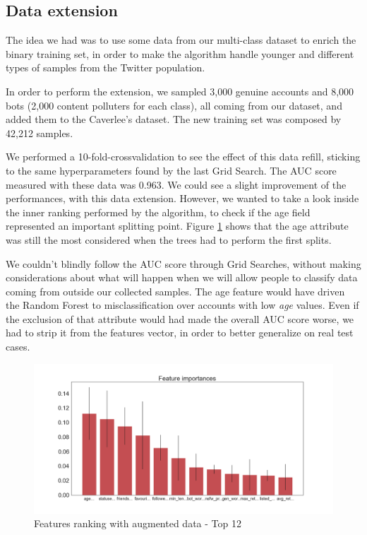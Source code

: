\subsection{Data extension}
The idea we had was to use some data from our multi-class dataset to enrich the binary training set, in order to make the algorithm handle younger and different types of samples from the Twitter population.

In order to perform the extension, we sampled 3,000 genuine accounts and 8,000 bots (2,000 content polluters for each class), all coming from our dataset, and added them to the Caverlee's dataset.
The new training set was composed by 42,212 samples.

We performed a 10-fold-crossvalidation to see the effect of this data refill, sticking to the same hyperparameters found by the last Grid Search. The AUC score measured with these data was 0.963. We could see a slight improvement of the performances, with this data extension. However, we wanted to take a look inside the inner ranking performed by the algorithm, to check if the age field represented an important splitting point.
Figure \ref{fig:bon_importances_ext} shows that the age attribute was still the most considered when the trees had to perform the first splits.

We couldn't blindly follow the AUC score through Grid Searches, without making considerations about what will happen when we will allow people to classify data coming from outside our collected samples.
The age feature would have driven the Random Forest to misclassification over accounts with low \textit{age} values.
Even if the exclusion of that attribute would had made the overall AUC score worse, we had to strip it from the features vector, in order to better generalize on real test cases.

\begin{figure}[htp!]
	\centering
	\includegraphics[width=\columnwidth]{chapter5/figure/bon_importances_extensions.png}
	\caption{Features ranking with augmented data - Top 12 }
	\label{fig:bon_importances_ext}
\end{figure}

